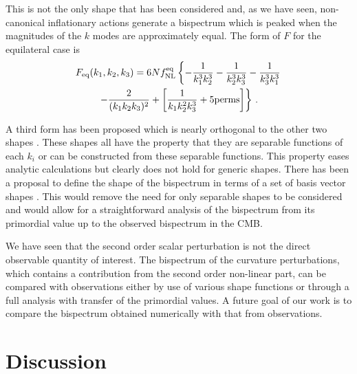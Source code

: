 This is not the only shape
that has been considered and, as we have seen, non-canonical inflationary actions generate a
bispectrum which is peaked
when the magnitudes of the $k$ modes are approximately equal. The form of $F$ for the equilateral
case is \cite{Komatsu:2010fb}
% 
\begin{multline}
 F_\mathrm{eq}(k_1,k_2,k_3) = 6 N f_{\mathrm{NL}}^{\mathrm{eq}} \left\{ -\frac{1}{k_1^3 k_2^3} -\frac{1}{k_2^3 k_3^3}
                                -\frac{1}{k_3^3 k_1^3}  \right.\\
                                \left.-\frac{2}{(k_1 k_2 k_3)^2}  + \left[ \frac{1}{k_1 k_2^2 k_3^3}
+ \mathrm{5 perms} \right]
                                \right\} \,.
\end{multline}
% 

A third form has been proposed which is nearly orthogonal to the other two shapes
\cite{Senatore:2009gt}. These shapes all have the property that they are separable functions of
each $k_i$ or can be constructed from these separable functions. This property eases analytic
calculations but clearly does not hold for generic shapes. 
% 
There has been a proposal to define the
shape of the bispectrum in terms of a set of basis vector shapes
\cite{Fergusson:2009nv,Liguori:2010hx}. This would remove the need for only separable shapes to be
considered and would allow for a straightforward analysis of the bispectrum from its primordial
value up to the observed bispectrum in the CMB. 

We have seen that the second order scalar perturbation is not the direct observable quantity of
interest. The bispectrum of the curvature perturbations, which contains a contribution from the
second order non-linear part, can be compared with observations either by use of various
shape functions or through a full analysis with transfer of the primordial values. A future goal of
our work is to compare the bispectrum obtained numerically with that from observations. 






% 
% 
% 
% 
\section{Discussion}
\label{sec:disc-perts}

